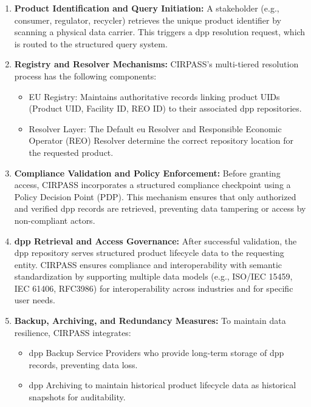 \begin{enumerate}[itemsep=0.5\baselineskip]
    \item \textbf{Product Identification and Query Initiation:} A stakeholder (e.g., consumer, regulator, recycler) retrieves the unique product identifier by scanning a physical data carrier. This triggers a \ac{dpp} resolution request, which is routed to the structured query system.
    
    \item \textbf{Registry and Resolver Mechanisms:} CIRPASS's multi-tiered resolution process has the following components:
    
    \begin{itemize}
        \item EU Registry: Maintains authoritative records linking product UIDs (Product UID, Facility ID, REO ID) to their associated \ac{dpp} repositories.
        \item Resolver Layer: The Default \ac{eu} Resolver and Responsible Economic Operator (REO) Resolver determine the correct repository location for the requested product.
    \end{itemize}
    
    \item \textbf{Compliance Validation and Policy Enforcement:} Before granting access, CIRPASS incorporates a structured compliance checkpoint using a Policy Decision Point (PDP). This mechanism ensures that only authorized and verified \ac{dpp} records are retrieved, preventing data tampering or access by non-compliant actors.

    \item \textbf{\ac{dpp} Retrieval and Access Governance:} After successful validation, the \ac{dpp} repository serves structured product lifecycle data to the requesting entity. CIRPASS ensures compliance and interoperability with semantic standardization by supporting multiple data models (e.g., ISO/IEC 15459, IEC 61406, RFC3986) for interoperability across industries and for specific user needs.
    
    \item \textbf{Backup, Archiving, and Redundancy Measures:} To maintain data resilience, CIRPASS integrates:
    \begin{itemize}
        \item \ac{dpp} Backup Service Providers who provide long-term storage of \ac{dpp} records, preventing data loss.
        \item \ac{dpp} Archiving to maintain historical product lifecycle data as historical snapshots for auditability.
    \end{itemize}
\end{enumerate}

